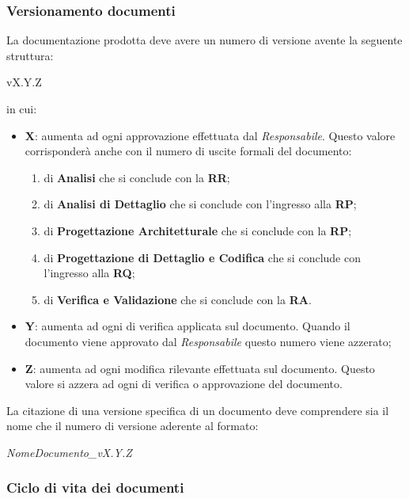 \documentclass{scalatekids-article}
\begin{document}
\subsubsection{Versionamento documenti}

La documentazione prodotta deve avere un numero di versione avente la seguente struttura:\\
\begin{center}
    vX.Y.Z
\end{center}
in cui:
\begin{itemize}
    \item \textbf{X}: aumenta  ad ogni approvazione effettuata dal \textit{Responsabile}. Questo valore corrisponderà anche con il numero di uscite formali del documento:
        \begin{enumerate}
            \item{} di \textbf{Analisi} che si conclude con la \textbf{RR};
            \item{} di \textbf{Analisi di Dettaglio} che si conclude con l'ingresso alla \textbf{RP};
            \item{} di \textbf{Progettazione Architetturale} che si conclude con la \textbf{RP};
            \item{} di \textbf{Progettazione di Dettaglio e Codifica} che si conclude con l'ingresso alla \textbf{RQ};
            \item{} di \textbf{Verifica e Validazione} che si conclude con la \textbf{RA}.
        \end{enumerate}
    \item \textbf{Y}: aumenta ad ogni  di verifica applicata sul documento. Quando il documento viene approvato dal \textit{Responsabile} questo numero viene azzerato;
    \item \textbf{Z}: aumenta ad ogni modifica rilevante effettuata sul documento. Questo valore si azzera ad ogni  di verifica o approvazione del documento.
\end{itemize}
La citazione di una versione specifica di un documento deve comprendere sia il nome che il numero di versione aderente al formato:
\begin{center}
    \textit{NomeDocumento\_vX.Y.Z}
\end{center}

\subsubsection{Ciclo di vita dei documenti}
\end{document}
